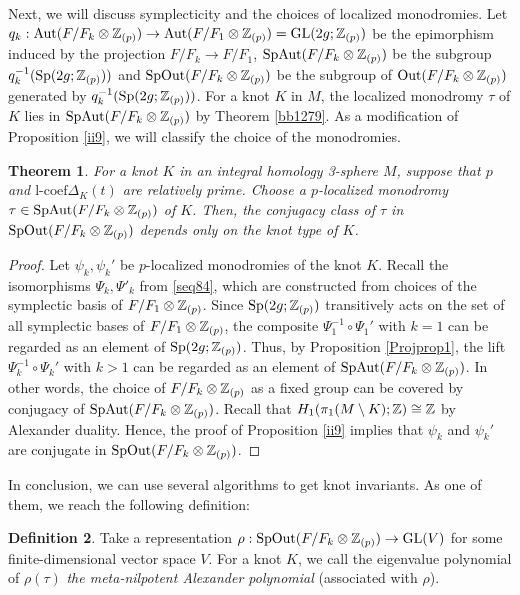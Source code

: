 \documentclass{article}
\theoremstyle{plain}
\newtheorem{thm}{Theorem}[section]
\theoremstyle{definition}
\newtheorem{defn}[thm]{Definition}
\newcommand{\ra}{\rightarrow}
\newcommand{\Z}{{\Bbb Z}}
\newcommand{\Aut}{{\rm Aut}}
\newcommand{\Out}{{\rm Out}}
\newcommand{\Sp}{{\rm Sp}}
\newcommand{\GL}{{\rm GL}}
\newcommand{\lc}{{\mathrm{l}\textrm{-}\mathrm{coef}}}
\begin{document}
{Next, we will discuss symplecticity and the choices of localized monodromies. Let $q_k : \Aut( F/F_k \otimes \Z_{(p)}) \ra \Aut(F/F_1 \otimes \Z_{(p)}) =\GL(2g;\Z_{(p)} )$ be the epimorphism induced by the projection $ F/F_k \ra F/F_1$, $\mathrm{SpAut}( F/F_k \otimes \Z_{(p)} )$ be the subgroup $q_k^{-1}(\Sp(2g;\Z_{(p)}))$ and $\mathrm{SpOut}( F/F_k \otimes \Z_{(p)} )$ be the subgroup of $\Out(F/F_k \otimes \Z_{(p)} )$ generated by $q_k^{-1}(\Sp(2g;\Z_{(p)}))$. For a knot $K$ in $M$, the localized monodromy $ \tau $ of $K$ lies in $ \mathrm{SpAut}( F/F_k \otimes \Z_{(p)} )$ by Theorem \ref{bb1279}. As a modification of Proposition \ref{ii9}, we will classify the choice of the monodromies.

\begin{thm}\label{ii98788}
For a knot $K$ in an integral homology 3-sphere $M$, suppose that $ p$ and $\lc \Delta_K(t)$ are relatively prime. Choose a $p$-localized monodromy $ \tau \in \mathrm{SpAut}( F/F_k \otimes \Z_{(p)} )$ of $K$. Then, the conjugacy class of $\tau$ in $\mathrm{SpOut}(F/F_k \otimes \Z_{(p)} )$ depends only on the knot type of $K$.
\end{thm}

\begin{proof}
Let $\psi_k , \psi_k'$ be $p$-localized monodromies of the knot $K$. Recall the isomorphisms $\Psi_k, \Psi'_k$ from \eqref{seq84}, which are constructed from choices of the symplectic basis of $ F/F_1 \otimes \Z_{(p)}$. Since $\Sp(2g ;\Z_{(p)})$ transitively acts on the set of all symplectic bases of $ F/F_1 \otimes \Z_{(p)}$, the composite $\Psi_1^{-1} \circ \Psi_1'$ with $k=1$ can be regarded as an element of $\Sp(2g ;\Z_{(p)})$. Thus, by Proposition \ref{Projprop1}, the lift $\Psi^{-1}_k \circ \Psi_k'$ with $k>1$ can be regarded as an element of $\mathrm{SpAut}(F /F_k \otimes \Z_{(p)})$. In other words, the choice of $F /F_k \otimes \Z_{(p)}$ as a fixed group can be covered by conjugacy of $ \mathrm{SpAut}(F/F_k \otimes \Z_{(p)} )$. Recall that $H_1( \pi_1(M \setminus K) ;\Z) \cong \Z $ by Alexander duality. Hence, the proof of Proposition \ref{ii9} implies that $ \psi_k$ and $ \psi_k'$ are conjugate in $\mathrm{SpOut}(F /F_k \otimes \Z_{(p)})$.
\end{proof}%

In conclusion, we can use several algorithms to get knot invariants. As one of them, we reach the following definition:
\begin{defn}\label{def115}
Take a representation $\rho : \mathrm{SpOut}(F/F_k \otimes \Z_{(p)} ) \ra \GL(V)$ for some finite-dimensional vector space $V$. For a knot $K$, we call the eigenvalue polynomial of $\rho(\tau) $ {\it the meta-nilpotent Alexander polynomial} (associated with $\rho$).
\end{defn}

}
\end{document}
